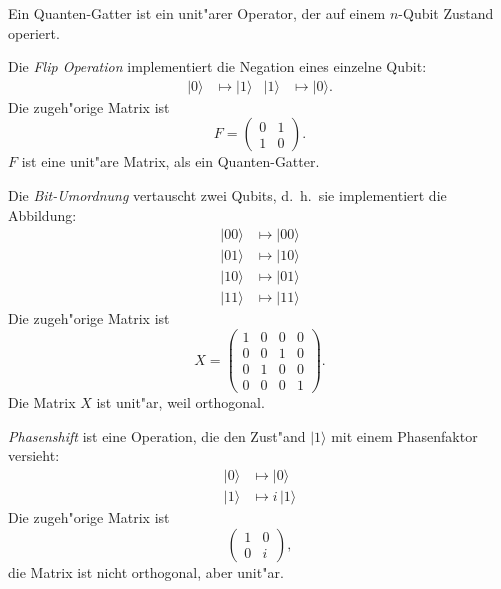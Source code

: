 \begin{definition}
Ein Quanten-Gatter ist ein unit"arer Operator, der auf einem 
$n$-Qubit Zustand operiert.
\end{definition}

\begin{beispiel}
Die {\em Flip Operation} implementiert die Negation eines einzelne Qubit:
\begin{align*}
|0\rangle&\mapsto |1\rangle & |1\rangle&\mapsto |0\rangle.
\end{align*}
Die zugeh"orige Matrix ist
\[
F=\begin{pmatrix}
0&1\\
1&0
\end{pmatrix}.
\]
$F$ ist eine unit"are Matrix, als ein Quanten-Gatter.
\end{beispiel}

\begin{beispiel}
Die {\em Bit-Umordnung} vertauscht zwei Qubits, d.~h.~sie implementiert
die Abbildung:
\begin{align*}
|00\rangle&\mapsto |00\rangle\\
|01\rangle&\mapsto |10\rangle\\
|10\rangle&\mapsto |01\rangle\\
|11\rangle&\mapsto |11\rangle
\end{align*}
Die zugeh"orige Matrix ist
\[
X=
\begin{pmatrix}
1&0&0&0\\
0&0&1&0\\
0&1&0&0\\
0&0&0&1
\end{pmatrix}.
\]
Die Matrix $X$ ist unit"ar, weil orthogonal.
\end{beispiel}

\begin{beispiel}
{\em Phasenshift} ist eine Operation, die den Zust"and $|1\rangle$ 
mit einem Phasenfaktor versieht:
\begin{align*}
|0\rangle &\mapsto |0\rangle\\
|1\rangle &\mapsto i\,|1\rangle
\end{align*}
Die zugeh"orige Matrix ist
\[
\begin{pmatrix}
1&0\\
0&i
\end{pmatrix},
\]
die Matrix ist nicht orthogonal, aber unit"ar.
\end{beispiel}


